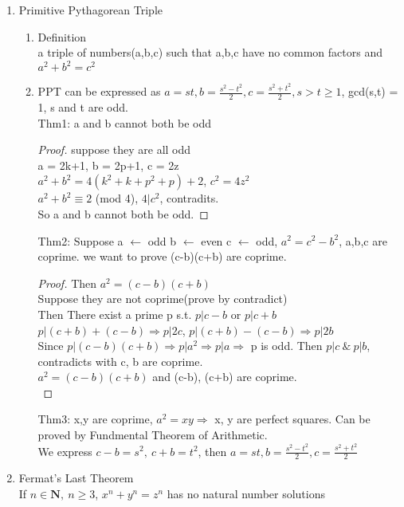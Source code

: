 \documentclass[10pt]{article}
\newcommand{\Nb}{\mathbf{N}}
\begin{document}
  
\begin{multicols}{2}
	
\begin{enumerate}
	
	\item Primitive Pythagorean Triple
	\begin{enumerate}
		\item Definition\\
		a triple of numbers(a,b,c) such that a,b,c have no common factors and $a^2 +b^2=c^2$
		\item PPT can be expressed as $a = st, b = \frac{s^2-t^2}{2}, c = \frac{s^2+t^2}{2}, s>t\ge 1 $, gcd(s,t) = 1, s and t are odd.\\
		Thm1: a and b cannot both be odd
		\begin{proof}
			suppose they are all odd\\
			a = 2k+1, b = 2p+1, c = 2z\\
			$a^2+b^2 = 4(k^2+k+p^2+p)+2$, $c^2 = 4z^2$\\
			$a^2+b^2 \equiv 2$ (mod 4), $4|c^2$, contradits.\\
			So a and b cannot both be odd.
		\end{proof}
		Thm2: Suppose a $\leftarrow$ odd b $\leftarrow$ even c $\leftarrow$ odd, $a^2 = c^2 - b^2$, a,b,c are coprime. we want to prove (c-b)(c+b) are coprime.
		\begin{proof}
			Then $a^2 = (c-b)(c+b)$\\
			Suppose they are not coprime(prove by contradict)\\
			Then There exist a prime p s.t. $p|c-b$ or $p|c+b$\\
			$p|(c+b)+(c-b) \Rightarrow p|2c$, $p|(c+b)-(c-b) \Rightarrow p|2b$\\
			Since $p|(c-b)(c+b)\Rightarrow p|a^2 \Rightarrow p|a \Rightarrow$ p is odd.
			Then $p|c \ \& \ p|b$, contradicts with c, b are coprime.\\
			$a^2 = (c-b)(c+b)$ and (c-b), (c+b) are coprime.\\
		\end{proof}				
		Thm3: x,y are coprime, $a^2 =xy\Rightarrow$ x, y are perfect squares. Can be proved by Fundmental Theorem of Arithmetic.\\
		We express $c-b = s^2, \ c+b = t^2$, then $a = st, b = \frac{s^2-t^2}{2}, c = \frac{s^2+t^2}{2}$
	\end{enumerate}

	\item Fermat's Last Theorem\\
	If $n \in \Nb, \ n \ge 3$, $x^n+y^n = z^n$ has no natural number solutions
	

\end{enumerate}
\end{multicols}
\end{document}

